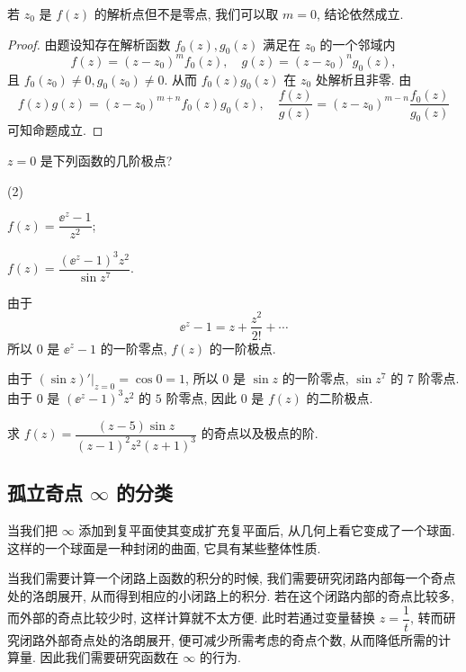 若 $z_0$ 是 $f(z)$ 的解析点但不是零点, 我们可以取 $m=0$, 结论依然成立.

\begin{proof}
  由题设知存在解析函数 $f_0(z),g_0(z)$ 满足在 $z_0$ 的一个邻域内
  \[
    f(z)=(z-z_0)^mf_0(z),\quad 
    g(z)=(z-z_0)^ng_0(z),
  \]
  且 $f_0(z_0)\neq0,g_0(z_0)\neq 0$.
  从而 $f_0(z)g_0(z)$ 在 $z_0$ 处解析且非零.
  由
  \[
    f(z)g(z)=(z-z_0)^{m+n}f_0(z)g_0(z),\quad
    \frac{f(z)}{g(z)}=(z-z_0)^{m-n}\frac{f_0(z)}{g_0(z)}
  \]
  可知命题成立.
\end{proof}

\begin{example}
  $z=0$ 是下列函数的几阶极点?
  \begin{subexample}(2)
    \item $f(z)=\dfrac{\ee^z-1}{z^2}$;
    \item $f(z)=\dfrac{(\ee^z-1)^3z^2}{\sin z^7}$.
  \end{subexample}
\end{example}

\begin{solutionenum}
  \item 由于
  \[
    \ee^z-1=z+\frac{z^2}{2!}+\cdots
  \]
  所以 $0$ 是 $\ee^z-1$ 的一阶零点, $f(z)$ 的一阶极点.
  \item 由于 $(\sin z)'|_{z=0}=\cos 0=1$, 所以 $0$ 是 $\sin z$ 的一阶零点, $\sin z^7$ 的 $7$ 阶零点.
  由于 $0$ 是 $(\ee^z-1)^3z^2$ 的 $5$ 阶零点, 因此 $0$ 是 $f(z)$ 的二阶极点.
\end{solutionenum}

\begin{exercise}
  求 $f(z)=\dfrac{(z-5)\sin z}{(z-1)^2z^2(z+1)^3}$ 的奇点以及极点的阶.
\end{exercise}


\subsection{孤立奇点 \texorpdfstring{$\infty$}{∞} 的分类\optional}

当我们把 $\infty$ 添加到复平面使其变成扩充复平面后, 从几何上看它变成了一个球面.
这样的一个球面是一种封闭的曲面, 它具有某些整体性质.

当我们需要计算一个闭路上函数的积分的时候,
我们需要研究闭路内部每一个奇点处的洛朗展开,
从而得到相应的小闭路上的积分.
若在这个闭路内部的奇点比较多, 而外部的奇点比较少时, 这样计算就不太方便.
此时若通过变量替换 $z=\dfrac1t$, 转而研究闭路外部奇点处的洛朗展开, 便可减少所需考虑的奇点个数, 从而降低所需的计算量.
因此我们需要研究函数在 $\infty$ 的行为.

